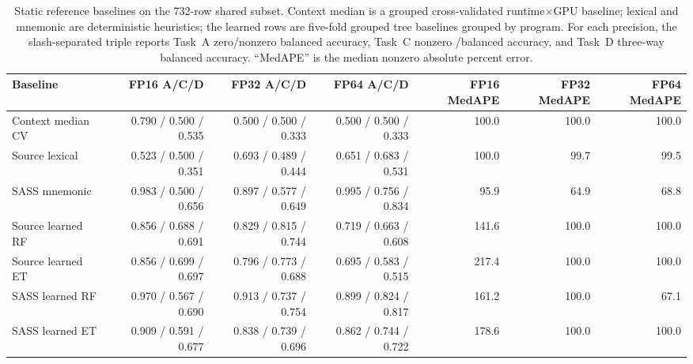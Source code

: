 \begin{table}[t]
  \centering
  \caption{Static reference baselines on the 732-row shared subset. Context median is a grouped cross-validated runtime$\times$GPU baseline; lexical and mnemonic are deterministic heuristics; the learned rows are five-fold grouped tree baselines grouped by program. For each precision, the slash-separated triple reports Task~A zero/nonzero balanced accuracy, Task~C nonzero \bandwidthbound/\computebound balanced accuracy, and Task~D three-way balanced accuracy. ``MedAPE'' is the median nonzero absolute percent error.}
  \label{tab:static-baselines}
  \scriptsize
  \setlength{\tabcolsep}{4pt}
  \begin{tabular}{lrrrrrr}
    \toprule
    Baseline & FP16 A/C/D & FP32 A/C/D & FP64 A/C/D & FP16 MedAPE & FP32 MedAPE & FP64 MedAPE \\
    \midrule
    Context median CV & 0.790 / 0.500 / 0.535 & 0.500 / 0.500 / 0.333 & 0.500 / 0.500 / 0.333 & 100.0 & 100.0 & 100.0 \\
    Source lexical & 0.523 / 0.500 / 0.351 & 0.693 / 0.489 / 0.444 & 0.651 / 0.683 / 0.531 & 100.0 & 99.7 & 99.5 \\
    SASS mnemonic & 0.983 / 0.500 / 0.656 & 0.897 / 0.577 / 0.649 & 0.995 / 0.756 / 0.834 & 95.9 & 64.9 & 68.8 \\
    Source learned RF & 0.856 / 0.688 / 0.691 & 0.829 / 0.815 / 0.744 & 0.719 / 0.663 / 0.608 & 141.6 & 100.0 & 100.0 \\
    Source learned ET & 0.856 / 0.699 / 0.697 & 0.796 / 0.773 / 0.688 & 0.695 / 0.583 / 0.515 & 217.4 & 100.0 & 100.0 \\
    SASS learned RF & 0.970 / 0.567 / 0.690 & 0.913 / 0.737 / 0.754 & 0.899 / 0.824 / 0.817 & 161.2 & 100.0 & 67.1 \\
    SASS learned ET & 0.909 / 0.591 / 0.677 & 0.838 / 0.739 / 0.696 & 0.862 / 0.744 / 0.722 & 178.6 & 100.0 & 100.0 \\
    \bottomrule
  \end{tabular}
\end{table}
